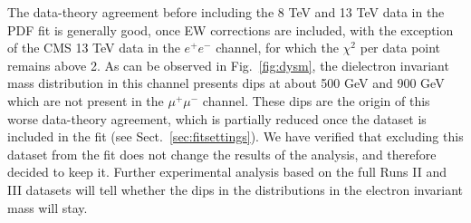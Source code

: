 \documentclass[withindex,glossary]{cam-thesis}
\begin{document}
The data-theory agreement before including the 
8 TeV and 13 TeV data in the PDF fit is generally good, once EW corrections 
are included, with the exception of the CMS 13 TeV data in the 
$e^+e^-$ channel, for which the $\chi^2$ per data point remains above 2.
%
As can be
observed in Fig.~\ref{fig:dysm}, the dielectron invariant mass distribution
in this channel presents dips at about
500 GeV and 900 GeV which are not present in the $\mu^+\mu^-$ channel.
%
These dips are the origin of this worse data-theory agreement,
which is partially reduced once the dataset is included in the fit
(see Sect.~\ref{sec:fitsettings}). 
We have verified that excluding this dataset from the fit does not 
change the results of the analysis, and therefore decided to keep it.
Further experimental analysis based on the full Runs II and III
datasets will tell whether the dips in the distributions in the
electron invariant mass will stay. 
\end{document}

